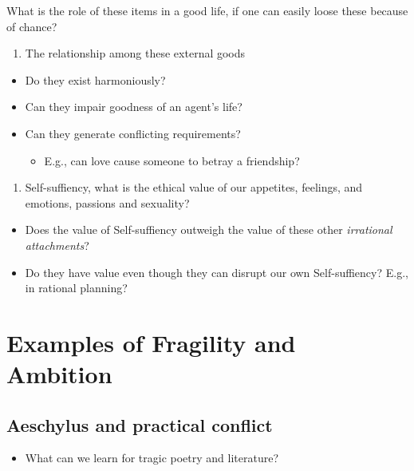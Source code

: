 \documentclass[
]{book}
\providecommand{\tightlist}{%
  \setlength{\itemsep}{0pt}\setlength{\parskip}{0pt}}
\begin{document}
What is the role of these items in a good life, if one can easily loose these because of chance?

\begin{enumerate}
\def\labelenumi{\arabic{enumi}.}
\setcounter{enumi}{1}
\tightlist
\item
  The relationship among these external goods
\end{enumerate}

\begin{itemize}
\tightlist
\item
  Do they exist harmoniously?
\item
  Can they impair goodness of an agent's life?
\item
  Can they generate conflicting requirements?

  \begin{itemize}
  \tightlist
  \item
    E.g., can love cause someone to betray a friendship?
  \end{itemize}
\end{itemize}

\begin{enumerate}
\def\labelenumi{\arabic{enumi}.}
\setcounter{enumi}{2}
\tightlist
\item
  Self-suffiency, what is the ethical value of our appetites, feelings, and emotions, passions and sexuality?
\end{enumerate}

\begin{itemize}
\tightlist
\item
  Does the value of Self-suffiency outweigh the value of these other \emph{irrational attachments}?
\item
  Do they have value even though they can disrupt our own Self-suffiency? E.g., in rational planning?
\end{itemize}

\section{Examples of Fragility and Ambition}\label{examples-of-fragility-and-ambition}

\subsection{Aeschylus and practical conflict}\label{aeschylus-and-practical-conflict}

\begin{itemize}
\tightlist
\item
  What can we learn for tragic poetry and literature?
\end{itemize}
\end{document}

